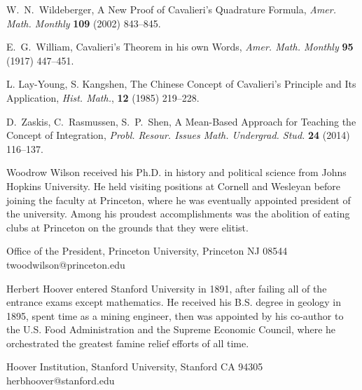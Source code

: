 \documentclass{article}
\theoremstyle{theorem}
\theoremstyle{definition}
\begin{document}
\begin{thebibliography}{10}
W.~N.~Wildeberger, A New Proof of Cavalieri's Quadrature Formula, \emph{Amer. Math. Monthly} \textbf{109} (2002) 843--845.

E.~G.~William, Cavalieri's Theorem in his own Words, \emph{Amer. Math. Monthly} \textbf{95} (1917) 447--451.

L. Lay-Young, S. Kangshen, The Chinese Concept of Cavalieri's Principle and Its Application, \emph{Hist. Math.}, \textbf{12} (1985) 219--228.
 
D.~Zaskis, C.~Rasmussen, S.~P.~Shen, A Mean-Based Approach for Teaching the Concept of Integration, \emph{Probl. Resour. Issues Math. Undergrad. Stud.} \textbf{24} (2014) 116--137.
\end{thebibliography}

\begin{biog}
\item[Woodrow Wilson] received his Ph.D. in history and political science from Johns Hopkins University. He held visiting positions at Cornell and Wesleyan before joining the faculty at Princeton, where he was eventually appointed president of the university.  Among his proudest accomplishments was the abolition of eating clubs at Princeton on the grounds that they were elitist.
\begin{affil}
Office of the President, Princeton University, Princeton NJ 08544\\
twoodwilson@princeton.edu
\end{affil}

\item[Herbert Hoover] entered Stanford University in 1891, after failing all of the entrance exams except mathematics.  He received his B.S. degree in geology in 1895, spent time as a mining engineer, then was appointed by his co-author to the U.S. Food Administration and the Supreme Economic Council, where he orchestrated the greatest famine relief efforts of all time.
\begin{affil}
Hoover Institution, Stanford University, Stanford CA 94305\\
herbhoover@stanford.edu
\end{affil}
\end{biog}
\vfill\eject
\end{document}
